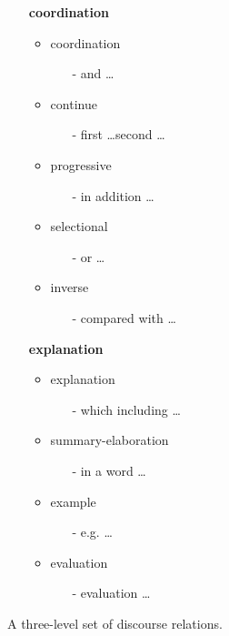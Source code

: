 \begin{figure}[h]
\begin{multicols}{2}
\begin{itemize}
  \vfill
  \columnbreak

  \item[] \textbf{coordination}
  \begin{itemize}
    \item coordination
    \begin{itemize}
      \item[-] and \ldots
    \end{itemize}
    \item continue
    \begin{itemize}
      \item[-] first \ldots second \ldots
    \end{itemize}
    \item progressive
    \begin{itemize}
      \item[-] in addition \ldots
    \end{itemize}
    \item selectional
    \begin{itemize}
      \item[-] or \ldots
    \end{itemize}
    \item inverse
    \begin{itemize}
      \item[-] compared with \ldots
    \end{itemize}
  \end{itemize}

  \item[] \textbf{explanation}
  \begin{itemize}
    \item explanation
    \begin{itemize}
      \item[-] which including \ldots
    \end{itemize}
    \item summary-elaboration
    \begin{itemize}
      \item[-] in a word \ldots
    \end{itemize}
    \item example
    \begin{itemize}
      \item[-] e.g. \ldots
    \end{itemize}
    \item evaluation
    \begin{itemize}
      \item[-] evaluation \ldots
    \end{itemize}
  \end{itemize}
\end{itemize}
\end{multicols}

\caption{\label{i:three-level} A three-level set of discourse relations. }
\end{figure}
